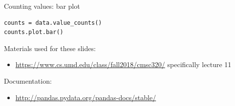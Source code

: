 \documentclass{beamer}
\begin{document}
\begin{frame}[fragile]{Counting values: bar plot}
\begin{lstlisting}
counts = data.value_counts()
counts.plot.bar()
\end{lstlisting}
\end{frame}




\begin{frame}
Materials used for these slides:
\begin{itemize}
\item \url{https://www.cs.umd.edu/class/fall2018/cmsc320/}
    specifically lecture 11
\end{itemize}

\vspace{1em}
Documentation:
\begin{itemize}
    \item \url{http://pandas.pydata.org/pandas-docs/stable/}
\end{itemize}
\end{frame}
\end{document}
